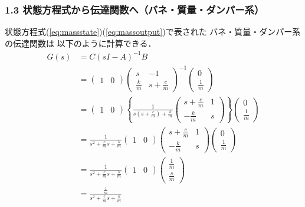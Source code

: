 \documentclass[10pt]{beamer}
\begin{document}
\begin{frame}[t]
\frametitle{1.3 状態方程式から伝達関数へ{\small （バネ・質量・ダンパー系）}}
状態方程式(\ref{eq:massstate})(\ref{eq:massoutput})で表された
バネ・質量・ダンパー系の伝達関数は
以下のように計算できる．
\begin{align}
 G(s)
 &= C (s I - A)^{-1} B \\
 &= \left(
     \begin{array}{cc}
      1 & 0
     \end{array}
    \right)
    \left(
     \begin{array}{cc}
      s           & -1 \\
      \frac{k}{m} & s+\frac{c}{m}
     \end{array}
    \right)^{-1}
    \left(
     \begin{array}{c}
      0 \\
      \frac{1}{m}
     \end{array}
    \right) \nonumber \\
 &= \left(
     \begin{array}{cc}
      1 & 0
     \end{array}
    \right)
    \left\{
     \frac{1}{s(s + \frac{c}{m})+\frac{k}{m}}
     \left(
     \begin{array}{cc}
      s+\frac{c}{m} & 1 \\
      -\frac{k}{m}  & s
     \end{array}
     \right)
    \right\}
    \left(
     \begin{array}{c}
      0 \\
      \frac{1}{m}
     \end{array}
    \right) \nonumber \\
 &= \frac{1}{s^2 + \frac{c}{m}s + \frac{k}{m}}
    \left(
     \begin{array}{cc}
      1 & 0
     \end{array}
    \right)
    \left(
     \begin{array}{cc}
      s+\frac{c}{m} & 1 \\
      -\frac{k}{m}  & s
     \end{array}
    \right)
    \left(
     \begin{array}{c}
      0 \\
      \frac{1}{m}
     \end{array}
    \right) \nonumber \\
 &= \frac{1}{s^2 + \frac{c}{m}s + \frac{k}{m}}
    \left(
     \begin{array}{cc}
      1 & 0
     \end{array}
    \right)
    \left(
     \begin{array}{c}
      \frac{1}{m} \\
      \frac{s}{m}
     \end{array}
    \right) \nonumber \\
 &= \frac{\frac{1}{m}}{s^2 + \frac{c}{m}s + \frac{k}{m}}
\end{align}
\end{frame}
\end{document}

